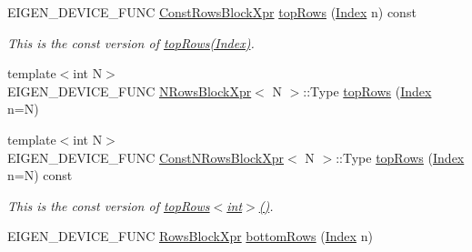 \begin{DoxyCompactItemize}
E\+I\+G\+E\+N\+\_\+\+D\+E\+V\+I\+C\+E\+\_\+\+F\+U\+NC \mbox{\hyperlink{class_eigen_1_1_block}{Const\+Rows\+Block\+Xpr}} \mbox{\hyperlink{class_eigen_1_1_sparse_matrix_base_a8e17950f7b7a973a1e51b77a8de21c44}{top\+Rows}} (\mbox{\hyperlink{struct_eigen_1_1_eigen_base_a554f30542cc2316add4b1ea0a492ff02}{Index}} n) const
\begin{DoxyCompactList}\small\item\em This is the const version of \mbox{\hyperlink{class_eigen_1_1_sparse_matrix_base_ab620d8edbf8f0d9369a7f2f9956228eb}{top\+Rows(\+Index)}}. \end{DoxyCompactList}\item 
{\footnotesize template$<$int N$>$ }\\E\+I\+G\+E\+N\+\_\+\+D\+E\+V\+I\+C\+E\+\_\+\+F\+U\+NC \mbox{\hyperlink{struct_eigen_1_1_sparse_matrix_base_1_1_n_rows_block_xpr}{N\+Rows\+Block\+Xpr}}$<$ N $>$\+::Type \mbox{\hyperlink{class_eigen_1_1_sparse_matrix_base_ae3eb4237ad09ee6313969049cc8f856a}{top\+Rows}} (\mbox{\hyperlink{struct_eigen_1_1_eigen_base_a554f30542cc2316add4b1ea0a492ff02}{Index}} n=N)
\item 
\mbox{\label{class_eigen_1_1_sparse_matrix_base_a9e4073e255c70b2324e99be47c3bf941}} 
{\footnotesize template$<$int N$>$ }\\E\+I\+G\+E\+N\+\_\+\+D\+E\+V\+I\+C\+E\+\_\+\+F\+U\+NC \mbox{\hyperlink{struct_eigen_1_1_sparse_matrix_base_1_1_const_n_rows_block_xpr}{Const\+N\+Rows\+Block\+Xpr}}$<$ N $>$\+::Type \mbox{\hyperlink{class_eigen_1_1_sparse_matrix_base_a9e4073e255c70b2324e99be47c3bf941}{top\+Rows}} (\mbox{\hyperlink{struct_eigen_1_1_eigen_base_a554f30542cc2316add4b1ea0a492ff02}{Index}} n=N) const
\begin{DoxyCompactList}\small\item\em This is the const version of \mbox{\hyperlink{class_eigen_1_1_sparse_matrix_base_ab620d8edbf8f0d9369a7f2f9956228eb}{top\+Rows$<$int$>$()}}. \end{DoxyCompactList}\item 
E\+I\+G\+E\+N\+\_\+\+D\+E\+V\+I\+C\+E\+\_\+\+F\+U\+NC \mbox{\hyperlink{class_eigen_1_1_block}{Rows\+Block\+Xpr}} \mbox{\hyperlink{class_eigen_1_1_sparse_matrix_base_a3035db49593e0d16a16e93a5cb405d02}{bottom\+Rows}} (\mbox{\hyperlink{struct_eigen_1_1_eigen_base_a554f30542cc2316add4b1ea0a492ff02}{Index}} n)
\item 
\mbox{\label{class_eigen_1_1_sparse_matrix_base_a7fe6a2433c70233623861c8fb4d9dad2}} 

\end{DoxyCompactItemize}
